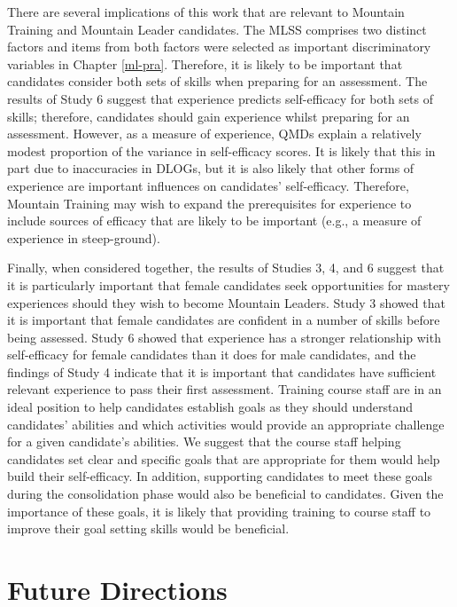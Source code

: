 \documentclass[
  12pt,
  a4paper,
]{book}
\begin{document}
There are several implications of this work that are relevant to Mountain Training and Mountain Leader candidates. The MLSS comprises two distinct factors and items from both factors were selected as important discriminatory variables in Chapter \ref{ml-pra}. Therefore, it is likely to be important that candidates consider both sets of skills when preparing for an assessment. The results of Study 6 suggest that experience predicts self-efficacy for both sets of skills; therefore, candidates should gain experience whilst preparing for an assessment. However, as a measure of experience, QMDs explain a relatively modest proportion of the variance in self-efficacy scores. It is likely that this in part due to inaccuracies in DLOGs, but it is also likely that other forms of experience are important influences on candidates' self-efficacy. Therefore, Mountain Training may wish to expand the prerequisites for experience to include sources of efficacy that are likely to be important (e.g., a measure of experience in steep-ground).

Finally, when considered together, the results of Studies 3, 4, and 6 suggest that it is particularly important that female candidates seek opportunities for mastery experiences should they wish to become Mountain Leaders. Study 3 showed that it is important that female candidates are confident in a number of skills before being assessed. Study 6 showed that experience has a stronger relationship with self-efficacy for female candidates than it does for male candidates, and the findings of Study 4 indicate that it is important that candidates have sufficient relevant experience to pass their first assessment. Training course staff are in an ideal position to help candidates establish goals as they should understand candidates' abilities and which activities would provide an appropriate challenge for a given candidate's abilities. We suggest that the course staff helping candidates set clear and specific goals that are appropriate for them would help build their self-efficacy. In addition, supporting candidates to meet these goals during the consolidation phase would also be beneficial to candidates. Given the importance of these goals, it is likely that providing training to course staff to improve their goal setting skills would be beneficial.

\hypertarget{chapter-4-future-directions}{%
\section{Future Directions}\label{chapter-4-future-directions}}
\end{document}
